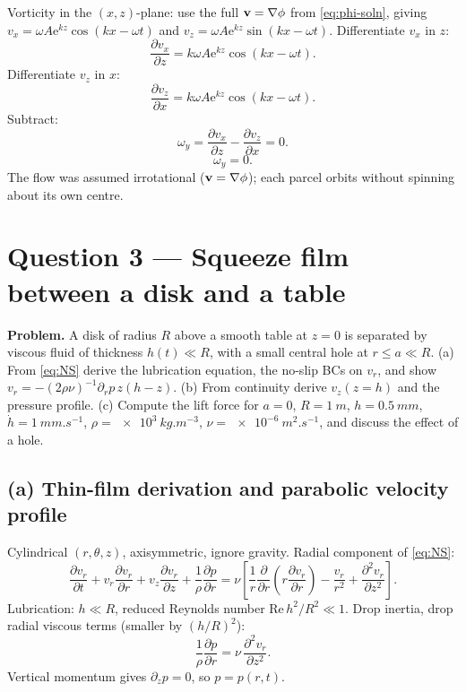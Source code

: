 \documentclass[11pt]{article}
\newcommand{\pd}[2]{\frac{\partial #1}{\partial #2}}
\newcommand{\pdd}[2]{\frac{\partial^{2} #1}{\partial #2^{2}}}
\begin{document}
Vorticity in the $(x,z)$-plane: use the full $\vb v=\nabla\phi$ from \eqref{eq:phi-soln}, giving $v_x=\omega A\mathrm{e}^{kz}\cos(kx-\omega t)$ and $v_z=\omega A\mathrm{e}^{kz}\sin(kx-\omega t)$. Differentiate $v_x$ in $z$:
\[ \pd{v_x}{z} = k\omega A\mathrm{e}^{kz}\cos(kx-\omega t). \]
Differentiate $v_z$ in $x$:
\[ \pd{v_z}{x} = k\omega A\mathrm{e}^{kz}\cos(kx-\omega t). \]
Subtract:
\[ \omega_y = \pd{v_x}{z}-\pd{v_z}{x} = 0. \]
\begin{equation}
\boxed{\;\omega_y = 0.\;}
\end{equation}
The flow was assumed irrotational ($\vb v=\nabla\phi$); each parcel orbits without spinning about its own centre.

\section*{Question 3 --- Squeeze film between a disk and a table}

\textbf{Problem.} A disk of radius $R$ above a smooth table at $z=0$ is separated by viscous fluid of thickness $h(t)\ll R$, with a small central hole at $r\le a\ll R$. (a) From \eqref{eq:NS} derive the lubrication equation, the no-slip BCs on $v_r$, and show $v_r=-(2\rho\nu)^{-1}\partial_r p\,z(h-z)$. (b) From continuity derive $v_z(z=h)$ and the pressure profile. (c) Compute the lift force for $a=0$, $R=\SI{1}{m}$, $h=\SI{0.5}{mm}$, $\dot h=\SI{1}{mm.s^{-1}}$, $\rho=\SI{e3}{kg.m^{-3}}$, $\nu=\SI{e-6}{m^2.s^{-1}}$, and discuss the effect of a hole.

\subsection*{(a) Thin-film derivation and parabolic velocity profile}

Cylindrical $(r,\theta,z)$, axisymmetric, ignore gravity. Radial component of \eqref{eq:NS}:
\begin{equation}
\pd{v_r}{t}+v_r\pd{v_r}{r}+v_z\pd{v_r}{z}+\frac{1}{\rho}\pd{p}{r} = \nu\!\left[\frac{1}{r}\pd{}{r}\!\left(r\pd{v_r}{r}\right)-\frac{v_r}{r^2}+\pdd{v_r}{z}\right].
\label{eq:NSr}
\end{equation}
Lubrication: $h\ll R$, reduced Reynolds number $\text{Re}\,h^2/R^2\ll 1$. Drop inertia, drop radial viscous terms (smaller by $(h/R)^2$):
\begin{equation}
\frac{1}{\rho}\pd{p}{r} = \nu\,\pdd{v_r}{z}.
\label{eq:thinfilm}
\end{equation}
Vertical momentum gives $\partial_z p=0$, so $p=p(r,t)$.
\end{document}

